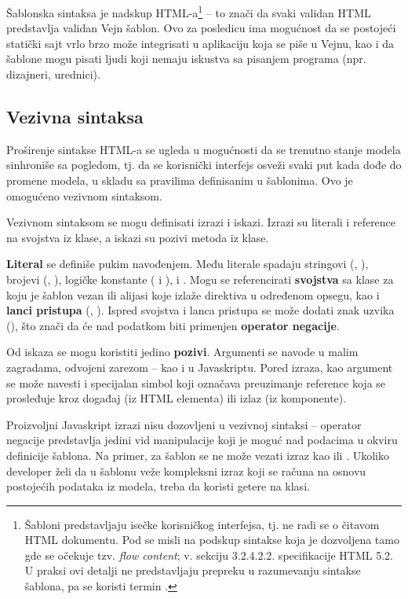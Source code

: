 Šablonska sintaksa je nadskup HTML-a\footnote{Šabloni predstavljaju isečke korisničkog interfejsa, tj. ne radi se o čitavom HTML dokumentu. Pod  se misli na podskup sintakse koja je dozvoljena tamo gde se očekuje tzv. \textsl{flow content}; v. sekciju 3.2.4.2.2. specifikacije HTML 5.2. U praksi ovi detalji ne predstavljaju prepreku u razumevanju sintakse šablona, pa se koristi termin .} -- to znači da svaki validan HTML predstavlja validan Vejn šablon.
Ovo za posledicu ima mogućnost da se postojeći statički sajt vrlo brzo može integrisati u aplikaciju koja se piše u Vejnu, kao i da šablone mogu pisati ljudi koji nemaju iskustva sa pisanjem programa (npr. dizajneri, urednici).

\subsection{Vezivna sintaksa}

Proširenje sintakse HTML-a se ugleda u mogućnosti da se trenutno stanje modela sinhroniše sa pogledom, tj. da se korisnički interfejs osveži svaki put kada dođe do promene modela, u skladu sa pravilima definisanim u šablonima.
Ovo je omogućeno vezivnom sintaksom.

Vezivnom sintaksom se mogu definisati izrazi i iskazi.
Izrazi su literali i reference na svojstva iz klase, a iskazi su pozivi metoda iz klase.

\textbf{Literal} se definiše pukim navođenjem.
Među literale spadaju stringovi (, ), brojevi (, ), logičke konstante ( i ),  i .
Mogu se referencirati \textbf{svojstva} sa klase za koju je šablon vezan ili alijasi koje izlaže direktiva u određenom opsegu, kao i \textbf{lanci pristupa} (, ).
Ispred svojstva i lanca pristupa se može dodati znak uzvika (\code{!}), što znači da će nad podatkom biti primenjen \textbf{operator negacije}.

Od iskaza se mogu koristiti jedino \textbf{pozivi}. Argumenti se navode u malim zagradama, odvojeni zarezom -- kao i u Javaskriptu.
Pored izraza, kao argument se može navesti i specijalan simbol \code{\#} koji označava preuzimanje reference koja se prosleđuje kroz događaj (iz HTML elementa) ili izlaz (iz komponente).

Proizvoljni Javaskript izrazi nisu dozovljeni u vezivnoj sintaksi -- operator negacije predstavlja jedini vid manipulacije koji je moguć nad podacima u okviru definicije šablona.
Na primer, za šablon se ne može vezati izraz kao  ili .
Ukoliko developer želi da u šablonu veže kompleksni izraz koji se računa na osnovu postojećih podataka iz modela, treba da koristi getere na klasi.

